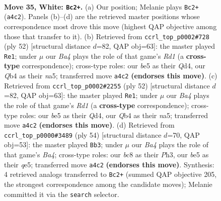 \documentclass[11pt]{article}
\begin{document}
\clearpage

\begin{figure}[p]\centering
\begin{subfigure}{0.46\textwidth}\centering
\resizebox{\linewidth}{!}{%
\newchessgame
\chessboard[
  setfen={r1b5/ppp2ppk/5n1p/3qb3/BQ6/5P1P/PP4P1/R1B4K w - - 10 35},
  showmover=false,
  pgfstyle=straightmove, color=movearrow, markmove={a4-c2}
]}
\caption{}
\end{subfigure}\hfill
\begin{subfigure}{0.46\textwidth}\centering
\resizebox{\linewidth}{!}{%
\newchessgame
\chessboard[
  setfen={4k2r/2q1b2p/p4ppB/np1B1b2/3Q4/7P/P1P2PP1/3R2K1 w k - 1 27},
  showmover=false,
  pgfstyle=straightmove, color=movearrow, markmove={d1-e1}
]}
\caption{}
\end{subfigure}
\\[4pt]
\begin{subfigure}{0.46\textwidth}\centering
\resizebox{\linewidth}{!}{%
\newchessgame
\chessboard[
  setfen={4k2r/2q1b2p/p4ppB/np1B1b2/3Q4/7P/P1P2PP1/3R2K1 w k - 1 27},
  showmover=false,
  pgfstyle=straightmove, color=movearrow, markmove={d1-e1}
]}
\caption{}
\end{subfigure}\hfill
\begin{subfigure}{0.46\textwidth}\centering
\resizebox{\linewidth}{!}{%
\newchessgame
\chessboard[
  setfen={2r3k1/pp3p1p/1b3n1B/4q1p1/B7/2PQP2P/PP4P1/3R2K1 w - - 3 28},
  showmover=false,
  pgfstyle=straightmove, color=movearrow, markmove={a4-b3}
]}
\caption{}
\end{subfigure}
\caption{\textbf{Move 35, White: \texttt{Bc2+}.} (a) Our position; Melanie plays \texttt{Bc2+} (\texttt{a4c2}). Panels (b)--(d) are the retrieved master positions whose correspondence most drove this move (highest QAP objective among those that transfer to it). (b) Retrieved from \texttt{ccrl\_top\_p0002\#728} (ply 52) [structural distance $d$=82, QAP obj=63]: the master played \texttt{Re1}; under $\mu$ our \emph{Ba4} plays the role of that game's \emph{Rd1} (a \textbf{cross-type} correspondence); cross-type roles: our \emph{b}e5 as their \emph{Q}d4, our \emph{Q}b4 as their \emph{n}a5; transferred move \texttt{a4c2} \textbf{(endorses this move)}. (c) Retrieved from \texttt{ccrl\_top\_p0002\#2255} (ply 52) [structural distance $d$=82, QAP obj=63]: the master played \texttt{Re1}; under $\mu$ our \emph{Ba4} plays the role of that game's \emph{Rd1} (a \textbf{cross-type} correspondence); cross-type roles: our \emph{b}e5 as their \emph{Q}d4, our \emph{Q}b4 as their \emph{n}a5; transferred move \texttt{a4c2} \textbf{(endorses this move)}. (d) Retrieved from \texttt{ccrl\_top\_p0000\#3489} (ply 54) [structural distance $d$=70, QAP obj=53]: the master played \texttt{Bb3}; under $\mu$ our \emph{Ba4} plays the role of that game's \emph{Ba4}; cross-type roles: our \emph{b}c8 as their \emph{P}h3, our \emph{b}e5 as their \emph{q}e5; transferred move \texttt{a4c2} \textbf{(endorses this move)}. Synthesis: 4 retrieved analogs transferred to \texttt{Bc2+} (summed QAP objective 205, the strongest correspondence among the candidate moves); Melanie committed it via the \texttt{search} selector.}
\label{fig:thought-m68}
\end{figure}
\end{document}
